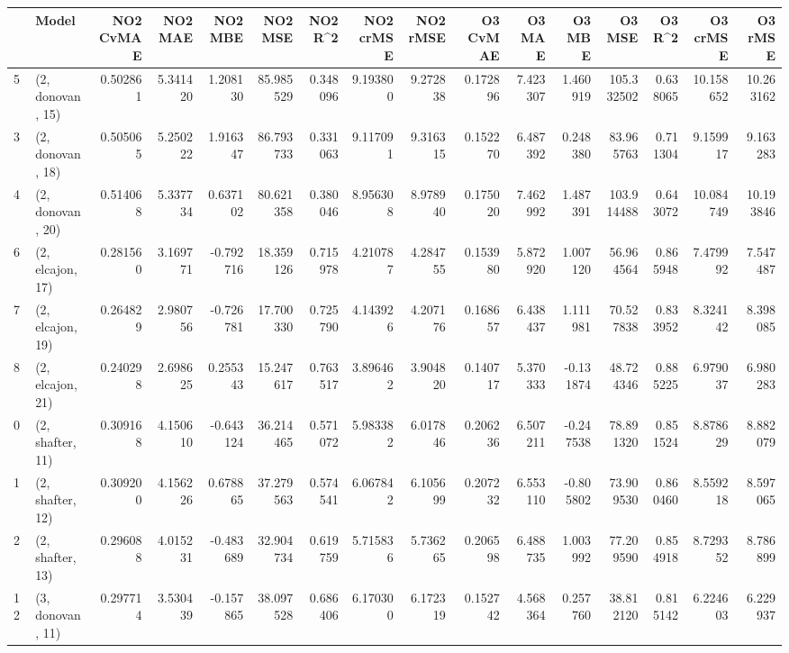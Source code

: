 \begin{tabular}{llrrrrrrrrrrrrrr}
\toprule
{} &             Model &  NO2 CvMAE &   NO2 MAE &   NO2 MBE &    NO2 MSE &   NO2 R\textasciicircum2 &  NO2 crMSE &  NO2 rMSE &  O3 CvMAE &    O3 MAE &    O3 MBE &      O3 MSE &    O3 R\textasciicircum2 &   O3 crMSE &    O3 rMSE \\
\midrule
5  &  (2, donovan, 15) &   0.502861 &  5.341420 &  1.208130 &  85.985529 &  0.348096 &   9.193800 &  9.272838 &  0.172896 &  7.423307 &  1.460919 &  105.332502 &  0.638065 &  10.158652 &  10.263162 \\
3  &  (2, donovan, 18) &   0.505065 &  5.250222 &  1.916347 &  86.793733 &  0.331063 &   9.117091 &  9.316315 &  0.152270 &  6.487392 &  0.248380 &   83.965763 &  0.711304 &   9.159917 &   9.163283 \\
4  &  (2, donovan, 20) &   0.514068 &  5.337734 &  0.637102 &  80.621358 &  0.380046 &   8.956308 &  8.978940 &  0.175020 &  7.462992 &  1.487391 &  103.914488 &  0.643072 &  10.084749 &  10.193846 \\
6  &  (2, elcajon, 17) &   0.281560 &  3.169771 & -0.792716 &  18.359126 &  0.715978 &   4.210787 &  4.284755 &  0.153980 &  5.872920 &  1.007120 &   56.964564 &  0.865948 &   7.479992 &   7.547487 \\
7  &  (2, elcajon, 19) &   0.264829 &  2.980756 & -0.726781 &  17.700330 &  0.725790 &   4.143926 &  4.207176 &  0.168657 &  6.438437 &  1.111981 &   70.527838 &  0.833952 &   8.324142 &   8.398085 \\
8  &  (2, elcajon, 21) &   0.240298 &  2.698625 &  0.255343 &  15.247617 &  0.763517 &   3.896462 &  3.904820 &  0.140717 &  5.370333 & -0.131874 &   48.724346 &  0.885225 &   6.979037 &   6.980283 \\
0  &  (2, shafter, 11) &   0.309168 &  4.150610 & -0.643124 &  36.214465 &  0.571072 &   5.983382 &  6.017846 &  0.206236 &  6.507211 & -0.247538 &   78.891320 &  0.851524 &   8.878629 &   8.882079 \\
1  &  (2, shafter, 12) &   0.309200 &  4.156226 &  0.678865 &  37.279563 &  0.574541 &   6.067842 &  6.105699 &  0.207232 &  6.553110 & -0.805802 &   73.909530 &  0.860460 &   8.559218 &   8.597065 \\
2  &  (2, shafter, 13) &   0.296088 &  4.015231 & -0.483689 &  32.904734 &  0.619759 &   5.715836 &  5.736265 &  0.206598 &  6.488735 &  1.003992 &   77.209590 &  0.854918 &   8.729352 &   8.786899 \\
12 &  (3, donovan, 11) &   0.297714 &  3.530439 & -0.157865 &  38.097528 &  0.686406 &   6.170300 &  6.172319 &  0.152742 &  4.568364 &  0.257760 &   38.812120 &  0.815142 &   6.224603 &   6.229937 \\

\end{tabular}

